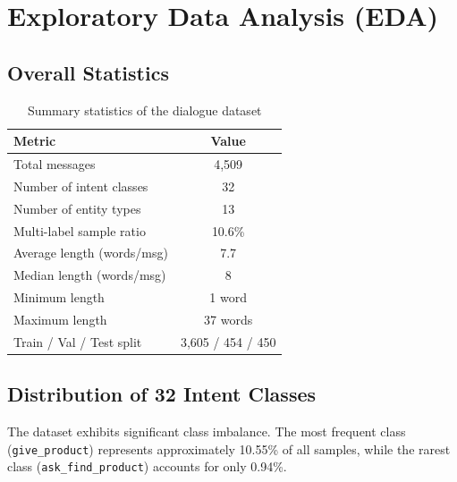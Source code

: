 \documentclass[12pt, a4paper]{report}
\begin{document}
\section{Exploratory Data Analysis (EDA)}

\subsection{Overall Statistics}

\begin{table}[H]
\centering
\caption{Summary statistics of the dialogue dataset}
\label{tab:data_stats}
\begin{tabular}{lc}
\toprule
\textbf{Metric} & \textbf{Value} \\
\midrule
Total messages               & 4,509 \\
Number of intent classes     & 32 \\
Number of entity types       & 13 \\
Multi-label sample ratio     & 10.6\% \\
Average length (words/msg)   & 7.7 \\
Median length (words/msg)    & 8 \\
Minimum length               & 1 word \\
Maximum length               & 37 words \\
Train / Val / Test split     & 3,605 / 454 / 450 \\
\bottomrule
\end{tabular}
\end{table}

\subsection{Distribution of 32 Intent Classes}

The dataset exhibits significant class imbalance.
The most frequent class (\texttt{give\_product}) represents approximately 10.55\%
of all samples, while the rarest class (\texttt{ask\_find\_product}) accounts for
only 0.94\%.
\end{document}
